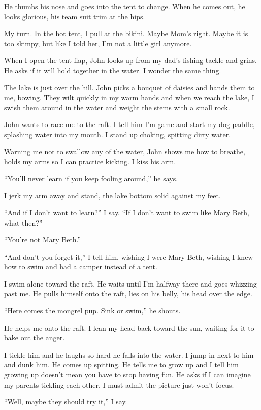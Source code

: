 \documentclass[twoside,10pt]{book}
\begin{document}
He thumbs his nose and goes into the tent to change. When he comes out,
he looks glorious, his team suit trim at the hips.

My turn. In the hot tent, I pull at the bikini. Maybe Mom's right. Maybe
it is too skimpy, but like I told her, I'm not a little girl anymore.

When I open the tent flap, John looks up from my dad's fishing tackle
and grins. He asks if it will hold together in the water. I wonder the
same thing.

The lake is just over the hill. John picks a bouquet of daisies and
hands them to me, bowing. They wilt quickly in my warm hands and when we
reach the lake, I swish them around in the water and weight the stems
with a small rock.

John wants to race me to the raft. I tell him I'm game and start my dog
paddle, splashing water into my mouth. I stand up choking, spitting
dirty water.

Warning me not to swallow any of the water, John shows me how to
breathe, holds my arms so I can practice kicking. I kiss his arm.

``You'll never learn if you keep fooling around,'' he says.

I jerk my arm away and stand, the lake bottom solid against my feet.

``And if I don't want to learn?'' I say. ``If I don't want to swim like
Mary Beth, what then?''

``You're not Mary Beth.''

``And don't you forget it,'' I tell him, wishing I were Mary Beth,
wishing I knew how to swim and had a camper instead of a tent.

I swim alone toward the raft. He waits until I'm halfway there and goes
whizzing past me. He pulls himself onto the raft, lies on his belly, his
head over the edge.

``Here comes the mongrel pup. Sink or swim,'' he shouts.

He helps me onto the raft. I lean my head back toward the sun, waiting
for it to bake out the anger.

I tickle him and he laughs so hard he falls into the water. I jump in
next to him and dunk him. He comes up spitting. He tells me to grow up
and I tell him growing up doesn't mean you have to stop having fun. He
asks if I can imagine my parents tickling each other. I must admit the
picture just won't focus.

``Well, maybe they should try it,'' I say.
\end{document}
